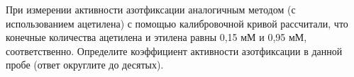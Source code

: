 
При измерении активности азотфиксации аналогичным методом (с использованием ацетилена) с помощью калибровочной кривой рассчитали, что конечные количества ацетилена и этилена равны 0,15 мМ и 0,95 мМ, соответственно. Определите коэффициент активности азотфиксации в данной пробе (ответ округлите до десятых).